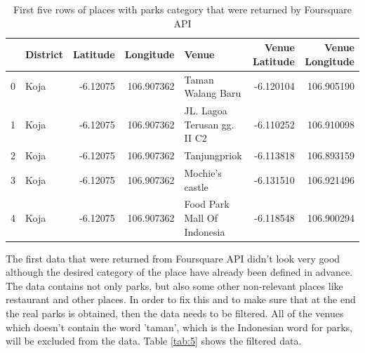 \begin{table}
\centering
\caption{First five rows of places with parks category that were returned by Foursquare API}
\label{tab:4}
\begin{adjustbox}{width=\textwidth}
\begin{tabular}{llrrlrr}
\toprule
{} & District &  Latitude &   Longitude &                        Venue &  Venue Latitude &  Venue Longitude \\
\midrule
0 &     Koja &  -6.12075 &  106.907362 &            Taman Walang Baru &       -6.120104 &       106.905190 \\
1 &     Koja &  -6.12075 &  106.907362 &  JL. Lagoa Terusan gg. II C2 &       -6.110252 &       106.910098 \\
2 &     Koja &  -6.12075 &  106.907362 &                 Tanjungpriok &       -6.113818 &       106.893159 \\
3 &     Koja &  -6.12075 &  106.907362 &              Mochie's castle &       -6.131510 &       106.921496 \\
4 &     Koja &  -6.12075 &  106.907362 &  Food Park Mall Of Indonesia &       -6.118548 &       106.900294 \\
\bottomrule
\end{tabular}
\end{adjustbox}
\end{table}

\noindent
The first data that were returned from Foursquare API didn't look very good although the desired category of the place have already been defined in advance. The data contains not only parks, but also some other non-relevant places like restaurant and other places.  In order to fix this and to make sure that at the end the real parks is obtained, then the data needs to be filtered. All of the venues which doesn't contain the word 'taman', which is the Indonesian word for parks, will be excluded from the data. Table \ref{tab:5} shows the filtered data.\\

